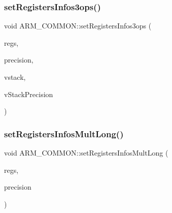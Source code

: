 \mbox{\label{classARM__COMMON_ac80dd82cbedd920afbaddbb021359698}} 
\subsubsection{\texorpdfstring{set\+Registers\+Infos3ops()}{setRegistersInfos3ops()}}
{\footnotesize\ttfamily void A\+R\+M\+\_\+\+C\+O\+M\+M\+O\+N\+::set\+Registers\+Infos3ops (\begin{DoxyParamCaption}\item[{\hyperlink{DAAInstruction_8h_af0fae93a861de9cf37988d5673cac523}{reg\+Table} \&}]{regs,  }\item[{\hyperlink{DAAInstruction_8h_a0e8cae02815a5f8adc750122d790b455}{reg\+Precision\+Table} \&}]{precision,  }\item[{\hyperlink{DAAInstruction_8h_a1b0e70ac1a04f06c8132055ed01f589f}{stack\+Type} \&}]{vstack,  }\item[{\hyperlink{DAAInstruction_8h_ac5cb793e9dac3fa9693da78b7e29ab30}{stack\+Prec\+Type} \&}]{v\+Stack\+Precision }\end{DoxyParamCaption})\hspace{0.3cm}{\ttfamily [protected]}}

\mbox{\label{classARM__COMMON_a7c573a648e1b612ce898523608d1ce17}} 
\subsubsection{\texorpdfstring{set\+Registers\+Infos\+Mult\+Long()}{setRegistersInfosMultLong()}}
{\footnotesize\ttfamily void A\+R\+M\+\_\+\+C\+O\+M\+M\+O\+N\+::set\+Registers\+Infos\+Mult\+Long (\begin{DoxyParamCaption}\item[{\hyperlink{DAAInstruction_8h_af0fae93a861de9cf37988d5673cac523}{reg\+Table} \&}]{regs,  }\item[{\hyperlink{DAAInstruction_8h_a0e8cae02815a5f8adc750122d790b455}{reg\+Precision\+Table} \&}]{precision }\end{DoxyParamCaption})\hspace{0.3cm}{\ttfamily [protected]}}

